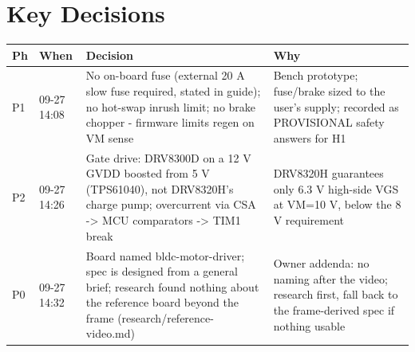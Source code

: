 \documentclass[11pt,a4paper]{article}
\begin{document}
\section{Key Decisions}
{\small
\begin{longtable}{lp{1.6cm}p{6.2cm}p{6.2cm}}
\toprule
\textbf{Ph} & \textbf{When} & \textbf{Decision} & \textbf{Why} \\
\midrule
\endhead
P1 & 09-27 14:08 & No on-board fuse (external 20 A slow fuse required, stated in guide); no hot-swap inrush limit; no brake chopper - firmware limits regen on VM sense & Bench prototype; fuse/brake sized to the user's supply; recorded as PROVISIONAL safety answers for H1 \\
P2 & 09-27 14:26 & Gate drive: DRV8300D on a 12 V GVDD boosted from 5 V (TPS61040), not DRV8320H's charge pump; overcurrent via CSA -\textgreater{} MCU comparators -\textgreater{} TIM1 break & DRV8320H guarantees only 6.3 V high-side VGS at VM=10 V, below the 8 V requirement \\
P0 & 09-27 14:32 & Board named bldc-motor-driver; spec is designed from a general brief; research found nothing about the reference board beyond the frame (research/reference-video.md) & Owner addenda: no naming after the video; research first, fall back to the frame-derived spec if nothing usable \\
\bottomrule
\end{longtable}
}
\end{document}
